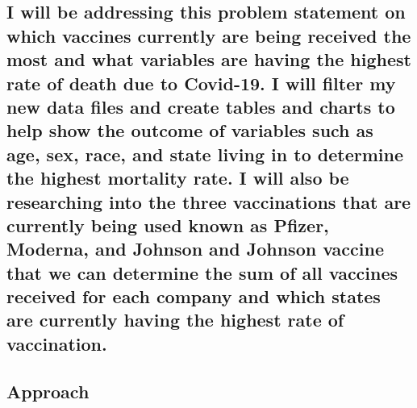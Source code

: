 \documentclass[
]{article}
\begin{document}
\hypertarget{i-will-be-addressing-this-problem-statement-on-which-vaccines-currently-are-being-received-the-most-and-what-variables-are-having-the-highest-rate-of-death-due-to-covid-19.-i-will-filter-my-new-data-files-and-create-tables-and-charts-to-help-show-the-outcome-of-variables-such-as-age-sex-race-and-state-living-in-to-determine-the-highest-mortality-rate.-i-will-also-be-researching-into-the-three-vaccinations-that-are-currently-being-used-known-as-pfizer-moderna-and-johnson-and-johnson-vaccine-that-we-can-determine-the-sum-of-all-vaccines-received-for-each-company-and-which-states-are-currently-having-the-highest-rate-of-vaccination.}{%
\subsection{I will be addressing this problem statement on which
vaccines currently are being received the most and what variables are
having the highest rate of death due to Covid-19. I will filter my new
data files and create tables and charts to help show the outcome of
variables such as age, sex, race, and state living in to determine the
highest mortality rate. I will also be researching into the three
vaccinations that are currently being used known as Pfizer, Moderna, and
Johnson and Johnson vaccine that we can determine the sum of all
vaccines received for each company and which states are currently having
the highest rate of
vaccination.}\label{i-will-be-addressing-this-problem-statement-on-which-vaccines-currently-are-being-received-the-most-and-what-variables-are-having-the-highest-rate-of-death-due-to-covid-19.-i-will-filter-my-new-data-files-and-create-tables-and-charts-to-help-show-the-outcome-of-variables-such-as-age-sex-race-and-state-living-in-to-determine-the-highest-mortality-rate.-i-will-also-be-researching-into-the-three-vaccinations-that-are-currently-being-used-known-as-pfizer-moderna-and-johnson-and-johnson-vaccine-that-we-can-determine-the-sum-of-all-vaccines-received-for-each-company-and-which-states-are-currently-having-the-highest-rate-of-vaccination.}}

\hypertarget{approach}{%
\subsection{Approach}\label{approach}}
\end{document}
